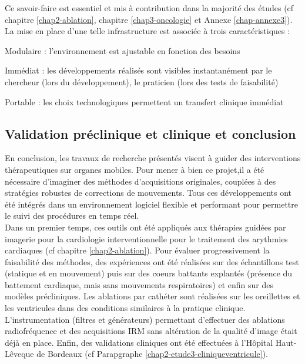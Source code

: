 \documentclass[10pt,a4paper]{report}
\begin{document}
Ce savoir-faire est essentiel et mis à contribution dans la majorité des études (cf chapitre \ref{chap2-ablation}, chapitre \ref{chap3-oncologie} et Annexe \ref{chap-annexe3}). La mise en place d’une telle infrastructure est associée à trois caractéristiques :
\begin{description}
\item Modulaire : l’environnement est ajustable en fonction des besoins
\item Immédiat : les développements réalisés sont visibles instantanément par le chercheur (lors du
développement), le praticien (lors des tests de faisabilité)
\item Portable : les choix technologiques permettent un transfert clinique immédiat
\end{description}

\subsection{Validation préclinique et clinique et conclusion}
\label{chap4-conclusion}

En conclusion, les travaux de recherche présentés visent à guider des interventions thérapeutiques sur organes mobiles. Pour mener à bien ce projet,il a été nécessaire d’imaginer des méthodes d’acquisitions originales, couplées à des stratégies robustes de corrections de mouvements. Tous ces développements ont été intégrés dans un environnement logiciel flexible et performant pour permettre le suivi des procédures en temps réel.\\

Dans un premier temps, ces outils ont été appliqués aux thérapies guidées par imagerie pour la cardiologie interventionnelle pour le traitement des arythmies cardiaques (cf chapitre \ref{chap2-ablation}). Pour évaluer progressivement la faisabilité des méthodes, des expériences ont été réalisées sur des échantillons test (statique et en mouvement) puis sur des coeurs battants explantés (présence du battement cardiaque, mais sans mouvements respiratoires) et enfin sur des modèles précliniques. Les ablations par cathéter sont réalisées sur les oreillettes et les ventricules dans des conditions similaires à la pratique clinique. L’instrumentation (filtres et générateurs) permettant d’effectuer des ablations radiofréquence et des acquisitions IRM sans altération de la qualité d’image était déjà en place. Enfin, des validations cliniques ont été effectuées à l’Hôpital Haut-Lêveque de Bordeaux (cf Parapgraphe \ref{chap2-etude3-cliniqueventricule}).\\



%
%
\renewcommand{\bibname}{References}


\end{document}

